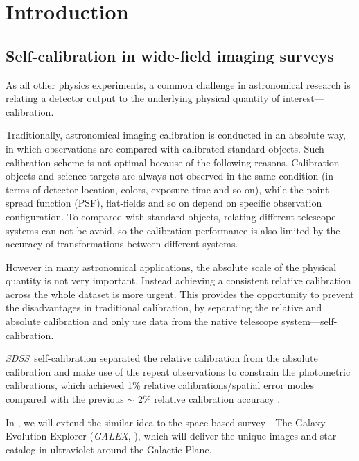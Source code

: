 \documentclass[12pt, preprint]{aastex}
\newcommand{\project}[1]{\textsl{#1}}
\newcommand{\galex}{\project{GALEX}}
\newcommand{\sdss}{\project{SDSS}}
\begin{document}
\section{Introduction}
\subsection{Self-calibration in wide-field imaging surveys}
As all other physics experiments, a common challenge in astronomical research is relating a detector output to the underlying physical quantity of interest---calibration.

Traditionally, astronomical imaging calibration is conducted in an absolute way, in which  observations are compared with calibrated standard objects.
Such calibration scheme is not optimal because of the following reasons. 
Calibration objects and science targets are always not observed in the same condition (in terms of detector location, colors, exposure time and so on), while the point-spread function (PSF), flat-fields and so on depend on specific observation configuration.
To compared with standard objects, relating different telescope systems can not be avoid, so the calibration performance is also limited by the accuracy of transformations between different systems.

However in many astronomical applications,  the absolute scale of the physical quantity is not very important.
Instead achieving a consistent relative calibration across the whole dataset is more urgent.
This provides the opportunity to prevent the disadvantages in traditional calibration, by separating the relative and absolute calibration and only use data from the native telescope system---self-calibration.

\sdss\ self-calibration \citep{uber} separated the relative calibration from the absolute calibration and make use of the repeat observations to constrain the photometric calibrations, which achieved 1\% relative calibrations/spatial error modes compared with the  previous $\sim$ 2\% relative calibration accuracy \citep{sdss2}.

In , we will extend the similar idea to the space-based survey---The Galaxy Evolution Explorer (\galex, \citealt{galex1}), which will deliver the unique images and star catalog in ultraviolet around the Galactic Plane. 
\end{document}
